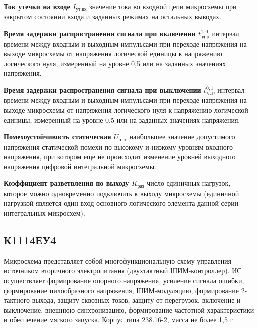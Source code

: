 \textbf{Ток утечки на входе $I_{\text{ут,вх}}$} \longndash значение тока во входной цепи микросхемы при закрытом состоянии входа и заданных режимах на остальных выводах.
 
\textbf{Время задержки распространения сигнала при включении $t_{\text{зд,p}}^{1,0}$} \longndash интервал времени между входным и выходным импульсами при переходе напряжения на выходе микросхемы от напряжения логической единицы к напряжению логического нуля, измеренный на уровне 0,5 или на заданных значениях напряжения.

\textbf{Время задержки распространения сигнала при выключении  $t_{\text{зд,p}}^{0,1}$} \longndash интервал времени между входным и выходным импульсами при переходе напряжения на выходе микросхемы от напряжения логического нуля к напряжению логической единицы, измеренный на уровне 0,5 или на заданных значениях напряжения. 

\textbf{Помехоустойчивость статическая $U_{\text{п,ст}}$} \longndash наибольшее значение допустимого напряжения статической помехи по высокому и низкому уровням входного напряжения, при котором еще не происходит изменение уровней выходного напряжения цифровой интегральной микросхемы. 

\textbf{Коэффициент разветвления по выходу $K_{\text{раз}}$} \longndash число единичных нагрузок, которое можно одновременно подключить к выходу микросхемы (единичной нагрузкой является один вход основного логического элемента данной серии интегральных микросхем).

\subsection*{К1114ЕУ4}

Микросхема представляет собой многофункциональную схему управления источником вторичного электропитания (двухтактный ШИМ-контроллер). ИС осуществляет формирование опорного напряжения, усиление сигнала ошибки, формирование пилообразного напряжения, ШИМ-модуляцию, формирование 2-тактного выхода, защиту сквозных токов, защиту от перегрузок, включение и выключение, внешнюю синхронизацию, формирование частотной характеристики и обеспечение мягкого запуска. Корпус типа 238.16-2, масса не более 1,5 г.

